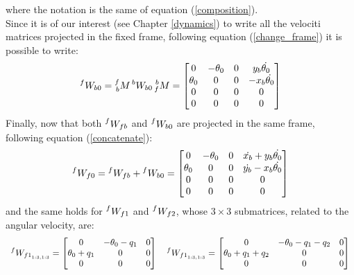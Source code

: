 \documentclass[a4paper,12pt,oneside]{report}
\begin{document}
where the notation is the same of equation (\ref{composition}).\\
Since it is of our interest (see Chapter \ref{dynamics}) to write all the velociti matrices projected in the fixed frame, following equation (\ref{change_frame}) it is possible to write:
\begin{equation}
    \prescript{f}{}{W_{b0}}=\prescript{f}{b}{M}\prescript{b}{}{W_{b0}}\prescript{b}{f}{M}=\begin{bmatrix}
      0&-\theta_0&0&y_b \dot{\theta_0}\\
      \theta_0&0&0&-x_b \dot{\theta_0}\\
      0&0&0&0\\
      0&0&0&0
    \end{bmatrix}
  \label{W_bo}
\end{equation}
Finally, now that both $\prescript{f}{}{W_{fb}}$ and $\prescript{f}{}{W_{b0}}$ are projected in the same frame, following equation (\ref{concatenate}):
\begin{equation}
    \prescript{f}{}{W_{f0}}=\prescript{f}{}{W_{fb}}+\prescript{f}{}{W_{b0}}=\begin{bmatrix}
      0&-\theta_0&0&\dot{x_b}+y_b \dot{\theta_0}\\
      \theta_0&0&0&\dot{y_b}-x_b \dot{\theta_0}\\
      0&0&0&0\\
      0&0&0&0
    \end{bmatrix}
    \label{arm_1_vel}
\end{equation}
and the same holds for $\prescript{f}{}{W_{f1}}$ and $\prescript{f}{}{W_{f2}}$, whose $3\times 3$ submatrices, related to the angular velocity, are:
  \begin{equation}
    \begin{array}{c}
      \prescript{f}{}{W_{{f1}_{1:3,1:3}}}=\begin{bmatrix}
        0&-\theta_0-q_1&0\\
        \theta_0+q_1&0&0\\
        0&0&0
      \end{bmatrix} \quad
      \prescript{f}{}{W_{{f1}_{1:3,1:3}}}=\begin{bmatrix}
        0&-\theta_0-q_1-q_2&0\\
        \theta_0+q_1+q_2&0&0\\
        0&0&0
      \end{bmatrix}
    \end{array}
    \label{arms_velocity}
  \end{equation}
\end{document}

